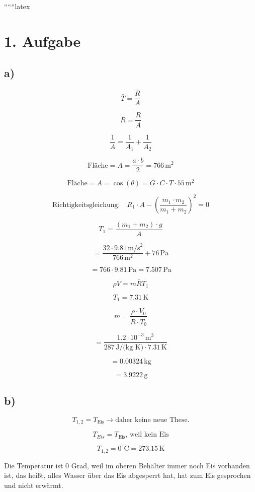 
``````latex


\section*{1. Aufgabe}

\subsection*{a)}

\[
\bar{T} = \frac{\bar{R}}{A}
\]

\[
\bar{R} = \frac{R}{A}
\]

\[
\frac{1}{A} = \frac{1}{A_1} + \frac{1}{A_2}
\]

\[
\text{Fläche} = A = \frac{a \cdot b}{2} = 766 \, \text{m}^2
\]

\[
\text{Fläche} = A = \cos(\theta) = G \cdot C \cdot T \cdot 55 \, \text{m}^2
\]

\[
\text{Richtigkeitsgleichung:} \quad R_1 \cdot A - \left( \frac{m_1 \cdot m_2}{m_1 + m_2} \right)^2 = 0
\]

\[
T_1 = \frac{(m_1 + m_2) \cdot g}{A}
\]

\[
= \frac{32 \cdot 9.81 \, \text{m/s}^2}{766 \, \text{m}^2} + 76 \, \text{Pa}
\]

\[
= 766 \cdot 9.81 \, \text{Pa} = 7.507 \, \text{Pa}
\]

\[
\rho V = m \bar{R} T_1
\]

\[
T_1 = 7.31 \, \text{K}
\]

\[
m = \frac{\rho \cdot V_0}{\bar{R} \cdot T_0}
\]

\[
= \frac{1.2 \cdot 10^{-3} \, \text{m}^3}{287 \, \text{J/(kg K)} \cdot 7.31 \, \text{K}}
\]

\[
= 0.00324 \, \text{kg}
\]

\[
= 3.9222 \, \text{g}
\]

\subsection*{b)}

\[
T_{1,2} = T_{\text{Eis}} \rightarrow \text{daher keine neue These.}
\]

\[
T_{Eis} = T_{\text{Eis}}, \, \text{weil kein Eis}
\]

\[
T_{1,2} = 0^\circ \text{C} = 273.15 \, \text{K}
\]

Die Temperatur ist 0 Grad, weil im oberen Behälter immer noch Eis vorhanden ist, das heißt, alles Wasser über das Eis abgesperrt hat, hat zum Eis gesprochen und nicht erwärmt.

